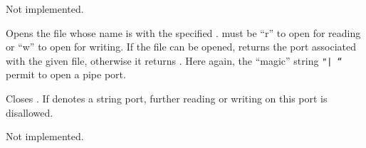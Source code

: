 \begin{entry}{%
\nopagebreak{}
}
\saut
Not implemented.
\end{entry}

\begin{entry}{%
}
\saut
Opens the file whose name is  with the specified
.  must be ``r'' to open for reading or ``w''
to open for writing. If the file can be opened, 
returns the port associated with the given file, otherwise it returns
{\schfalse}. Here again, the ``magic'' string {\tt "|~``} permit to
open a pipe port.
\end{entry}

\begin{entry}{%
}
\saut
Closes . If  denotes a string port, further
reading or writing on this port is disallowed.
\end{entry}

\begin{entry}{%
\nopagebreak{}
}
\saut
Not implemented.
\end{entry}

